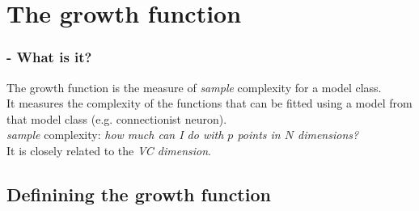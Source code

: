 \section{The growth function}


\begin{frame}\frametitle{\secname - What is it?}

The growth function is the measure of \emph{sample} complexity for a model class.\\[5mm]

It measures the complexity of the functions that can be fitted using a model from that model class (e.g. connectionist neuron).\\[5mm]

\emph{sample} complexity: \emph{how much can I do with $p$ points in $N$ dimensions?}\\[10mm]

It is closely related to the \emph{VC dimension}.

\end{frame}

\subsection{Definining the growth function}

